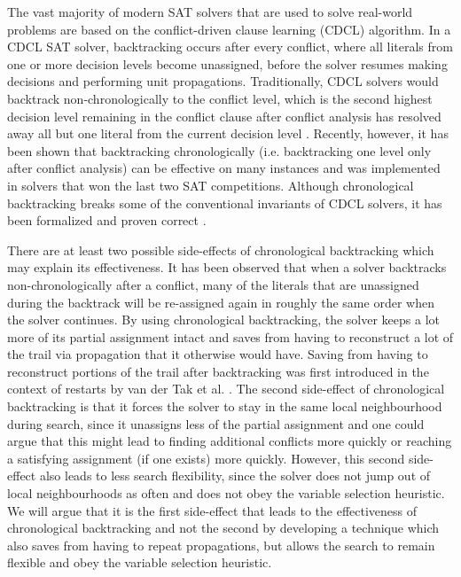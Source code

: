 \documentclass[runningheads]{llncs}
\begin{document}
The vast majority of modern SAT solvers that are used to solve
real-world problems are based on the conflict-driven clause learning
(CDCL) algorithm. In a CDCL SAT solver, backtracking occurs after
every conflict, where all literals from one or more decision levels
become unassigned, before the solver resumes making decisions and
performing unit propagations. Traditionally, CDCL solvers would
backtrack non-chronologically to the conflict level, which is the
second highest decision level remaining in the conflict clause after
conflict analysis has resolved away all but one literal from the
current decision level \cite{DBLP:conf/dac/MoskewiczMZZM01}. Recently,
however, it has been shown that backtracking chronologically
\cite{DBLP:conf/lpar/JiangZ13} (i.e. backtracking one level only after
conflict analysis)
\cite{DBLP:conf/sat/NadelR18,DBLP:conf/sat/MohleB19} can be effective
on many instances and was implemented in solvers that won the last two
SAT competitions. Although chronological backtracking breaks some of
the conventional invariants of CDCL solvers, it has been formalized
and proven correct \cite{DBLP:conf/sat/MohleB19}.

There are at least two possible side-effects of chronological
backtracking which may explain its effectiveness. It has been observed
that when a solver backtracks non-chronologically after a conflict,
many of the literals that are unassigned during the backtrack will be
re-assigned again in roughly the same order when the solver
continues. By using chronological backtracking, the solver keeps a lot
more of its partial assignment intact and saves from having to
reconstruct a lot of the trail via propagation that it otherwise would
have. Saving from having to reconstruct portions of the trail after
backtracking was first introduced in the context of restarts by van
der Tak et al. \cite{DBLP:journals/jsat/TakRH112}. The second
side-effect of chronological backtracking is that it forces the solver
to stay in the same local neighbourhood during search, since it
unassigns less of the partial assignment and one could argue that this
might lead to finding additional conflicts more quickly or reaching a
satisfying assignment (if one exists) more quickly. However, this
second side-effect also leads to less search flexibility, since the
solver does not jump out of local neighbourhoods as often and does not
obey the variable selection heuristic. We will argue that it is the
first side-effect that leads to the effectiveness of chronological
backtracking and not the second by developing a technique which also
saves from having to repeat propagations, but allows the search to
remain flexible and obey the variable selection heuristic.
\end{document}
